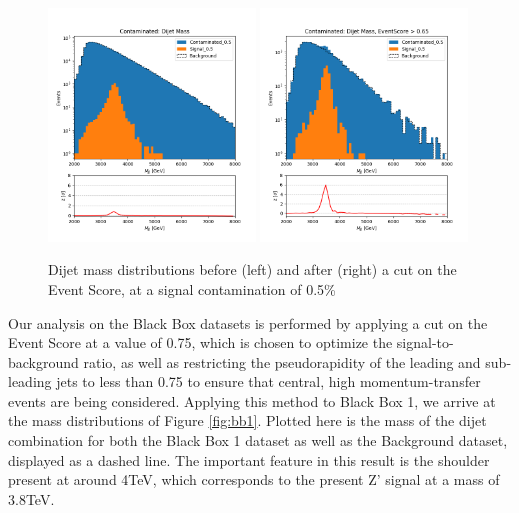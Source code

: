 \documentclass[letterpaper,11pt]{article}
\begin{document}
\begin{figure}[h!]
	\begin{center}
		\includegraphics[width=0.49\textwidth]{imgs/2Prong_Contaminated_0p5_JJ_Mass_Multi.png}
		\includegraphics[width=0.49\textwidth]{imgs/2Prong_Contaminated_0p5_JJ_Mass_EventScore0p65_Multi.png}
	\end{center}
	\caption{Dijet mass distributions before (left) and after (right) a cut on the Event Score, at a signal contamination of 0.5\%}
	\label{fig:m_JJ}
\end{figure}

Our analysis on the Black Box datasets is performed by applying a cut on the Event Score at a value of 0.75, which is chosen to optimize the signal-to-background ratio, as well as restricting the pseudorapidity of the leading and sub-leading jets to less than 0.75 to ensure that central, high momentum-transfer events are being considered. Applying this method to Black Box 1, we arrive at the mass distributions of Figure {\ref{fig:bb1}}. Plotted here is the mass of the dijet combination for both the Black Box 1 dataset as well as the Background dataset, displayed as a dashed line. The important feature in this result is the shoulder present at around 4TeV, which corresponds to the present Z' signal at a mass of 3.8TeV. 
\end{document}
